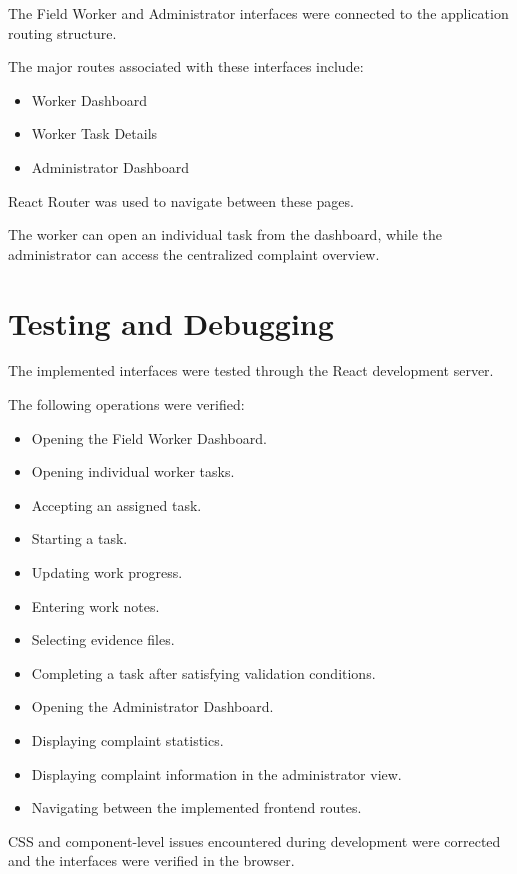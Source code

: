 \documentclass[12pt,a4paper]{article}
\begin{document}
The Field Worker and Administrator interfaces were connected to the
application routing structure.

The major routes associated with these interfaces include:

\begin{itemize}
    \item Worker Dashboard
    \item Worker Task Details
    \item Administrator Dashboard
\end{itemize}

React Router was used to navigate between these pages.

The worker can open an individual task from the dashboard, while the
administrator can access the centralized complaint overview.

\section{Testing and Debugging}

The implemented interfaces were tested through the React development
server.

The following operations were verified:

\begin{itemize}
    \item Opening the Field Worker Dashboard.
    \item Opening individual worker tasks.
    \item Accepting an assigned task.
    \item Starting a task.
    \item Updating work progress.
    \item Entering work notes.
    \item Selecting evidence files.
    \item Completing a task after satisfying validation conditions.
    \item Opening the Administrator Dashboard.
    \item Displaying complaint statistics.
    \item Displaying complaint information in the administrator view.
    \item Navigating between the implemented frontend routes.
\end{itemize}

CSS and component-level issues encountered during development were corrected
and the interfaces were verified in the browser.
\end{document}
